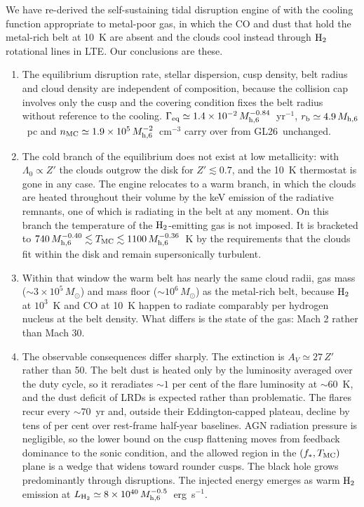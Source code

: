 \documentclass[twocolumn,pdftex]{aastex701}
\newcommand{\msun}{M_{\odot}}
\newcommand{\mhsix}{M_{\rm h,6}}
\newcommand{\Zp}{Z'}
\newcommand{\fst}{f_{\ast}}
\newcommand{\Geq}{\Gamma_{\rm eq}}
\newcommand{\GL}{GL26}
\newcommand{\Htwo}{{\rm H_2}}
\begin{document}
We have re-derived the self-sustaining tidal disruption engine of \citet{Guillochon:2026a} with the cooling function appropriate to metal-poor gas, in which the CO and dust that hold the metal-rich belt at 10~K are absent and the clouds cool instead through $\Htwo$ rotational lines in LTE. Our conclusions are these.

\begin{enumerate}
\item The equilibrium disruption rate, stellar dispersion, cusp density, belt radius and cloud density are independent of composition, because the collision cap involves only the cusp and the covering condition fixes the belt radius without reference to the cooling. $\Geq\simeq1.4\times10^{-2}\,\mhsix^{-0.84}$~yr$^{-1}$, $r_{\rm b}\simeq4.9\,\mhsix$~pc and $n_{\rm MC}\simeq1.9\times10^{5}\,\mhsix^{-2}$~cm$^{-3}$ carry over from \GL\ unchanged.
\item The cold branch of the equilibrium does not exist at low metallicity: with $\Lambda_0\propto\Zp$ the clouds outgrow the disk for $\Zp\lesssim0.7$, and the 10~K thermostat is gone in any case. The engine relocates to a warm branch, in which the clouds are heated throughout their volume by the keV emission of the radiative remnants, one of which is radiating in the belt at any moment. On this branch the temperature of the $\Htwo$-emitting gas is not imposed. It is bracketed to $740\,\mhsix^{-0.40}\lesssim T_{\rm MC}\lesssim1100\,\mhsix^{-0.36}$~K by the requirements that the clouds fit within the disk and remain supersonically turbulent.
\item Within that window the warm belt has nearly the same cloud radii, gas mass ($\sim3\times10^{5}\,\msun$) and mass floor ($\sim10^{6}\,\msun$) as the metal-rich belt, because $\Htwo$ at $10^{3}$~K and CO at 10~K happen to radiate comparably per hydrogen nucleus at the belt density. What differs is the state of the gas: Mach 2 rather than Mach 30.
\item The observable consequences differ sharply. The extinction is $A_V\simeq27\,\Zp$ rather than 50. The belt dust is heated only by the luminosity averaged over the duty cycle, so it reradiates $\sim1$ per cent of the flare luminosity at $\sim60$~K, and the dust deficit of LRDs is expected rather than problematic. The flares recur every $\sim70$~yr and, outside their Eddington-capped plateau, decline by tens of per cent over rest-frame half-year baselines. AGN radiation pressure is negligible, so the lower bound on the cusp flattening moves from feedback dominance to the sonic condition, and the allowed region in the $(\fst,T_{\rm MC})$ plane is a wedge that widens toward rounder cusps. The black hole grows predominantly through disruptions. The injected energy emerges as warm $\Htwo$ emission at $L_{\Htwo}\simeq8\times10^{40}\,\mhsix^{-0.5}$~erg~s$^{-1}$.

\end{enumerate}
\end{document}
